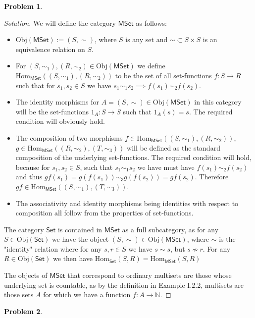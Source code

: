 \documentclass{article}
\theoremstyle{definition}
\newtheorem{problem-internal}{Problem}[subsection]
\newenvironment{problem}{
	\medskip
	\begin{problem-internal}
	}{
\end{problem-internal}
}
\newenvironment{solution}{
	\begin{proof}[Solution]
		\vspace{-8px}
		\setlength{\parskip}{4px}
		\setlength{\parindent}{0px}
	}{
\end{proof}
}
\newcommand{\Obj}{\mathrm{Obj}}
\newcommand{\Hom}{\mathrm{Hom}}
\newcommand{\Cset}{\mathsf{Set}}
\begin{document}
\begin{problem}
\end{problem}

\begin{solution}
	We will define the category $\mathsf{MSet}$ as follows:
	\begin{itemize}
		\item $\Obj(\mathsf{MSet}) := (S, \sim)$, where $S$ is any set and $\sim \subset S \times S$ is an equivalence relation on $S$.
		\item For $(S, \sim_1), (R, \sim_2) \in \Obj(\mathsf{MSet})$ we define $\Hom_{\mathsf{MSet}}((S, \sim_1),(R, \sim_2))$ to be the set of all set-functions $f: S \to R$ such that for $s_1, s_2 \in S$ we have $s_1 \sim_1 s_2 \implies f(s_1) \sim_2 f(s_2)$.
		\item The identity morphisms for $A=(S, \sim) \in \Obj(\mathsf{MSet})$ in this category will be the set-functions $1_A: S \to S$ such that $1_A(s) = s$. The required condition will obviously hold.
		\item The composition of two morphisms $f \in \Hom_\mathsf{MSet}((S, \sim_1), (R, \sim_2))$, $g \in \Hom_\mathsf{MSet}((R, \sim_2),(T, \sim_3))$ will be defined as the standard composition of the underlying set-functions. The required condition will hold, because for $s_1, s_2 \in S$, such that $s_1 \sim_1 s_2$ we have must have $f(s_1) \sim_2 f(s_2)$ and thus $gf(s_1) = g(f(s_1)) \sim_3 g(f(s_2)) = gf(s_2)$. Therefore $gf \in \Hom_\mathsf{MSet}((S, \sim_1),(T, \sim_3))$.
		\item The associativity and identity morphisms being identities with respect to composition all follow from the properties of set-functions.
	\end{itemize}
	
	The category $\Cset$ is contained in $\mathsf{MSet}$ as a full subcategory, as for any $S \in \Obj(\Cset)$ we have the object $(S, \sim) \in \Obj(\mathsf{MSet})$, where $\sim$ is the "identity" relation where for any $s,r \in S$ we have $s \sim s$, but $s \not \sim r$.  For any $R \in \Obj(\Cset)$ we then have $\Hom_\Cset(S,R) = \Hom_\mathsf{MSet}(S,R)$
	
	The objects of $\mathsf{MSet}$ that correspond to ordinary multisets are those whose underlying set is countable, as by the definition in Example I.2.2, multisets are those sets $A$ for which we have a function $f: A \to \mathbb{N}$.
\end{solution}

\begin{problem}
\end{problem}
\end{document}
